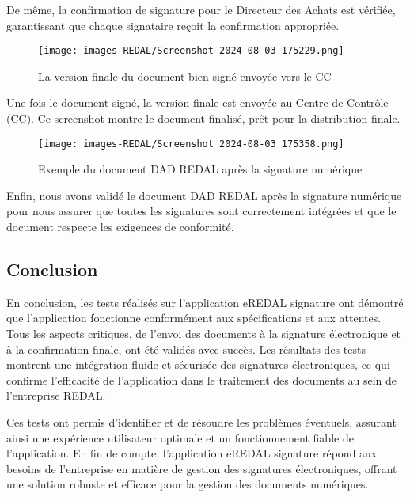De même, la confirmation de signature pour le Directeur des Achats est vérifiée, garantissant que chaque signataire reçoit la confirmation appropriée.

\begin{figure}[H]
\begin{center}
\texttt{[image: images-REDAL/Screenshot 2024-08-03 175229.png]}
\end{center}
\caption{La version finale du document bien signé envoyée vers le CC}
\end{figure}

Une fois le document signé, la version finale est envoyée au Centre de Contrôle (CC). Ce screenshot montre le document finalisé, prêt pour la distribution finale.

\begin{figure}[H]
\begin{center}
\texttt{[image: images-REDAL/Screenshot 2024-08-03 175358.png]}
\end{center}
\caption{Exemple du document DAD REDAL après la signature numérique}
\end{figure}

Enfin, nous avons validé le document DAD REDAL après la signature numérique pour nous assurer que toutes les signatures sont correctement intégrées et que le document respecte les exigences de conformité.


\newpage
\subsection{Conclusion}

En conclusion, les tests réalisés sur l'application eREDAL signature ont démontré que l'application fonctionne conformément aux spécifications et aux attentes. Tous les aspects critiques, de l'envoi des documents à la signature électronique et à la confirmation finale, ont été validés avec succès. Les résultats des tests montrent une intégration fluide et sécurisée des signatures électroniques, ce qui confirme l'efficacité de l'application dans le traitement des documents au sein de l'entreprise REDAL.

Ces tests ont permis d'identifier et de résoudre les problèmes éventuels, assurant ainsi une expérience utilisateur optimale et un fonctionnement fiable de l'application. En fin de compte, l'application eREDAL signature répond aux besoins de l'entreprise en matière de gestion des signatures électroniques, offrant une solution robuste et efficace pour la gestion des documents numériques.











